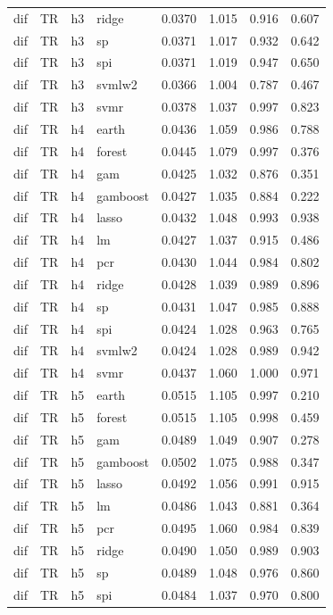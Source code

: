 \begin{ThreePartTable}
\begin{longtable}[t]{llclcccc}
dif & TR & h3 & ridge & 0.0370 & 1.015 & 0.916 & 0.607\\
dif & TR & h3 & sp & 0.0371 & 1.017 & 0.932 & 0.642\\
dif & TR & h3 & spi & 0.0371 & 1.019 & 0.947 & 0.650\\
dif & TR & h3 & svmlw2 & 0.0366 & 1.004 & 0.787 & 0.467\\
dif & TR & h3 & svmr & 0.0378 & 1.037 & 0.997 & 0.823\\
\addlinespace
dif & TR & h4 & earth & 0.0436 & 1.059 & 0.986 & 0.788\\
dif & TR & h4 & forest & 0.0445 & 1.079 & 0.997 & 0.376\\
dif & TR & h4 & gam & 0.0425 & 1.032 & 0.876 & 0.351\\
dif & TR & h4 & gamboost & 0.0427 & 1.035 & 0.884 & 0.222\\
dif & TR & h4 & lasso & 0.0432 & 1.048 & 0.993 & 0.938\\
dif & TR & h4 & lm & 0.0427 & 1.037 & 0.915 & 0.486\\
dif & TR & h4 & pcr & 0.0430 & 1.044 & 0.984 & 0.802\\
dif & TR & h4 & ridge & 0.0428 & 1.039 & 0.989 & 0.896\\
dif & TR & h4 & sp & 0.0431 & 1.047 & 0.985 & 0.888\\
dif & TR & h4 & spi & 0.0424 & 1.028 & 0.963 & 0.765\\
dif & TR & h4 & svmlw2 & 0.0424 & 1.028 & 0.989 & 0.942\\
dif & TR & h4 & svmr & 0.0437 & 1.060 & 1.000 & 0.971\\
\addlinespace
dif & TR & h5 & earth & 0.0515 & 1.105 & 0.997 & 0.210\\
dif & TR & h5 & forest & 0.0515 & 1.105 & 0.998 & 0.459\\
dif & TR & h5 & gam & 0.0489 & 1.049 & 0.907 & 0.278\\
dif & TR & h5 & gamboost & 0.0502 & 1.075 & 0.988 & 0.347\\
dif & TR & h5 & lasso & 0.0492 & 1.056 & 0.991 & 0.915\\
dif & TR & h5 & lm & 0.0486 & 1.043 & 0.881 & 0.364\\
dif & TR & h5 & pcr & 0.0495 & 1.060 & 0.984 & 0.839\\
dif & TR & h5 & ridge & 0.0490 & 1.050 & 0.989 & 0.903\\
dif & TR & h5 & sp & 0.0489 & 1.048 & 0.976 & 0.860\\
dif & TR & h5 & spi & 0.0484 & 1.037 & 0.970 & 0.800\\

\end{longtable}
\end{ThreePartTable}
